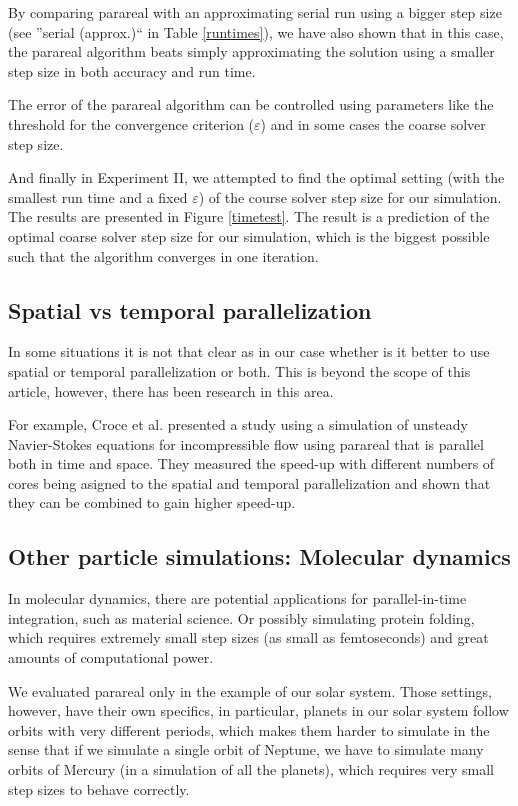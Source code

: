 \documentclass[conference]{IEEEtran}
\begin{document}
By comparing parareal with an approximating serial run using a bigger step size (see ''serial (approx.)`` in Table \ref{runtimes}), we have also shown that in this case, the parareal algorithm beats simply approximating the solution using a smaller step size in both accuracy and run time. 

The error of the parareal algorithm can be controlled using parameters like the threshold for the convergence criterion ($\varepsilon$) and in some cases the coarse solver step size.

And finally in Experiment II, we attempted to find the optimal setting (with the smallest run time and a fixed $\varepsilon$) of the course solver step size for our simulation. The results are presented in Figure \ref{timetest}. The result is a prediction of the optimal coarse solver step size for our simulation, which is the biggest possible such that the algorithm converges in one iteration.

\subsection{Spatial vs temporal parallelization}

In some situations it is not that clear as in our case whether is it better to use spatial or temporal parallelization or both. This is beyond the scope of this article, however, there has been research in this area.

For example, Croce et al. presented a study using a simulation of unsteady Navier-Stokes equations for incompressible flow using parareal that is parallel both in time and space. They measured the speed-up with different numbers of cores being asigned to the spatial and temporal parallelization and shown that they can be combined to gain higher speed-up. \cite{spacetime}

\subsection{Other particle simulations: Molecular dynamics}
In molecular dynamics, there are potential applications for parallel-in-time integration, such as material science. \cite{moldyn} Or possibly simulating protein folding, which requires extremely small step sizes (as small as femtoseconds) and great amounts of computational power. \cite{protein}

We evaluated parareal only in the example of our solar system. Those settings, however, have their own specifics, in particular, planets in our solar system follow orbits with very different periods, which makes them harder to simulate in the sense that if we simulate a single orbit of Neptune, we have to simulate many orbits of Mercury (in a simulation of all the planets), which requires very small step sizes to behave correctly. 
\end{document}
